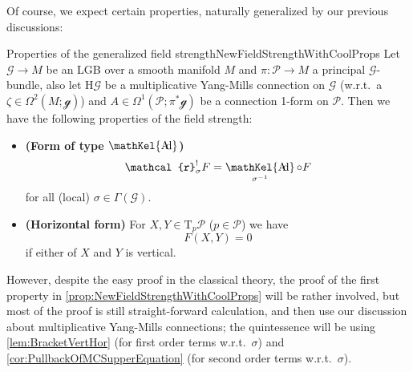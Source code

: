\documentclass[reqno,a4paper,oneside]{amsart}
\theoremstyle{plain}
\theoremstyle{remark}
\theoremstyle{definition}
\DeclareMathOperator{\sAd}{\mathKel{A\mkern-5.5mu d}}
\begin{document}
Of course, we expect certain properties, naturally generalized by our previous discussions:

\begin{propositions}{Properties of the generalized field strength}{NewFieldStrengthWithCoolProps}
Let $\mathcal{G} \to M$ be an LGB over a smooth manifold $M$ and $\pi\colon\mathcal{P} \to M$ a principal $\mathcal{G}$-bundle, also let $\mathrm{H}\mathcal{G}$ be a multiplicative Yang-Mills connection on $\mathcal{G}$ (w.r.t.\ a $\zeta \in \Omega^2(M; \mathcal{g})$) and $A \in \Omega^1(\mathcal{P}; \pi^*\mathcal{g})$ be a connection 1-form on $\mathcal{P}$. Then we have the following properties of the field strength:
\begin{itemize}
	\item \textbf{(Form of type $\sAd$)}
	\begin{equation*}
	\mathcal{r}_{\sigma}^!F
	=
	\sAd_{\sigma^{-1}} \circ F
	\end{equation*}
	for all (local) $\sigma \in \Gamma(\mathcal{G})$.
	\item \textbf{(Horizontal form)}
	\newline
	For $X, Y \in \mathrm{T}_p\mathcal{P}$ ($p \in \mathcal{P}$) we have
	\begin{equation*}
	F(X, Y)
	=
	0
	\end{equation*}
	if either of $X$ and $Y$ is vertical.
\end{itemize}
\end{propositions}

However, despite the easy proof in the classical theory, the proof of the first property in \ref{prop:NewFieldStrengthWithCoolProps} will be rather involved, but most of the proof is still straight-forward calculation, and then use our discussion about multiplicative Yang-Mills connections; the quintessence will be using \ref{lem:BracketVertHor} (for first order terms w.r.t.\ $\sigma$) and \ref{cor:PullbackOfMCSupperEquation} (for second order terms w.r.t.\ $\sigma$).
\end{document}

